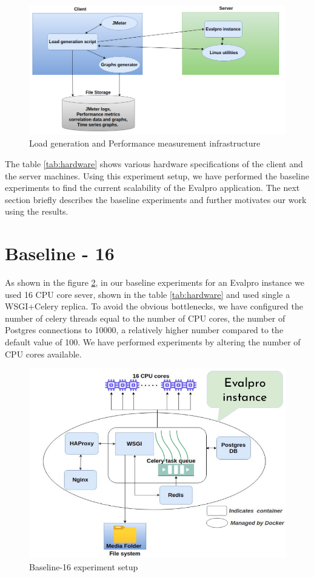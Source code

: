 \documentclass{iitbreport}
\begin{document}
\begin{figure}[!htb]
  \centering
  \includegraphics[width=\linewidth]{Images/Measurement_infrastructure.png}
  \caption{Load generation and Performance measurement infrastructure}
  \label{loag_gen_measure}
\end{figure}




The table \ref{tab:hardware} shows various hardware specifications of the client and the server machines. Using this experiment setup, we have performed the baseline experiments to find the current scalability of the Evalpro application. The next section briefly describes the baseline experiments and further motivates our work using the results.

\section{Baseline - 16}\label{baseline_16}

As shown in the figure \ref{baseline_16_setup}, in our baseline experiments for an Evalpro instance we used 16 CPU core sever, shown in the table \ref{tab:hardware} and used single a WSGI+Celery replica. To avoid the obvious bottlenecks, we have configured the number of celery threads equal to the number of CPU cores, the number of Postgres connections to 10000, a relatively higher number compared to the default value of 100. We have performed experiments by altering the number of CPU cores available.
\begin{figure}[!htb]
  \centering
  \includegraphics[width=\linewidth]{Images/Baseline-16.png}
  \caption{Baseline-16 experiment setup}
  \label{baseline_16_setup}
\end{figure}
\end{document}
